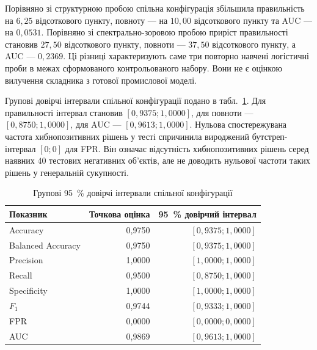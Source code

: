 \begin{table}[htbp]
\caption{Тестові результати діагностичних конфігурацій незалежного експерименту}
\label{tab:ch4_ind_svs_metrics}
\centering
\small
{}
\end{table}

Порівняно зі структурною пробою спільна конфігурація збільшила правильність на $6{,}25$ відсоткового пункту, повноту --- на $10{,}00$ відсоткового пункту та AUC --- на $0{,}0531$. Порівняно зі спектрально-зоровою пробою приріст правильності становив $27{,}50$ відсоткового пункту, повноти --- $37{,}50$ відсоткового пункту, а AUC --- $0{,}2369$. Ці різниці характеризують саме три повторно навчені логістичні проби в межах сформованого контрольованого набору. Вони не є оцінкою вилучення складника з готової промислової моделі.

Групові довірчі інтервали спільної конфігурації подано в табл.~\ref{tab:ch4_ind_svs_ci}. Для правильності інтервал становив $[0{,}9375;1{,}0000]$, для повноти --- $[0{,}8750;1{,}0000]$, для AUC --- $[0{,}9613;1{,}0000]$. Нульова спостережувана частота хибнопозитивних рішень у тесті спричинила вироджений бутстреп-інтервал $[0;0]$ для FPR. Він означає відсутність хибнопозитивних рішень серед наявних $40$ тестових негативних об'єктів, але не доводить нульової частоти таких рішень у генеральній сукупності.

\begin{table}[htbp]
\caption{Групові 95~\% довірчі інтервали спільної конфігурації}
\label{tab:ch4_ind_svs_ci}
\centering
\small
\begin{tabular}{lrr}
\toprule
Показник & Точкова оцінка & 95~\% довірчий інтервал \\
\midrule
Accuracy & 0,9750 & $[0{,}9375; 1{,}0000]$ \\
Balanced Accuracy & 0,9750 & $[0{,}9375; 1{,}0000]$ \\
Precision & 1,0000 & $[1{,}0000; 1{,}0000]$ \\
Recall & 0,9500 & $[0{,}8750; 1{,}0000]$ \\
Specificity & 1,0000 & $[1{,}0000; 1{,}0000]$ \\
$F_1$ & 0,9744 & $[0{,}9333; 1{,}0000]$ \\
FPR & 0,0000 & $[0{,}0000; 0{,}0000]$ \\
AUC & 0,9869 & $[0{,}9613; 1{,}0000]$ \\
\bottomrule
\end{tabular}
\end{table}


